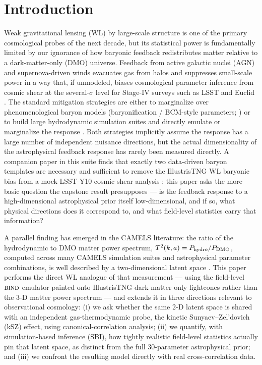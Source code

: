 \documentclass[11pt]{article}
\newcommand{\bind}{\textsc{bind}}
\begin{document}
\section{Introduction}\label{sec:intro}

Weak gravitational lensing (WL) by large-scale structure is one of the
primary cosmological probes of the next decade, but its statistical power
is fundamentally limited by our ignorance of how baryonic feedback
redistributes matter relative to a dark-matter-only (DMO) universe.
Feedback from active galactic nuclei (AGN) and supernova-driven winds
evacuates gas from halos and suppresses small-scale power in a way that,
if unmodeled, biases cosmological parameter inference from cosmic shear
at the several-$\sigma$ level for Stage-IV surveys such as LSST and Euclid
\citep{vanDaalen2020,Schneider2022clusters,Amonetal2023}.
The standard mitigation strategies are either to marginalize over
phenomenological baryon models (baryonification / BCM-style parameters;
\citealp{Arico2024,Schneider2022clusters}) or to build large hydrodynamic
simulation suites and directly emulate or marginalize the response
\citep{VillaescusaNavarro2021CAMELS,Schaye2023FLAMINGO}.
Both strategies implicitly assume the response has a large number of
independent nuisance directions, but the actual dimensionality of the
astrophysical feedback response has rarely been measured directly.
A companion paper in this suite finds that exactly two data-driven baryon
templates are necessary and sufficient to remove the IllustrisTNG WL
baryonic bias from a mock LSST-Y10 cosmic-shear analysis
\citep[Paper~II]{bindII}; this paper asks the more basic question the
capstone result presupposes — is the feedback response to a
high-dimensional astrophysical prior itself low-dimensional, and if so,
what physical directions does it correspond to, and what field-level
statistics carry that information?

A parallel finding has emerged in the CAMELS literature: the ratio of the
hydrodynamic to DMO matter power spectrum, $T^2(k,a) = P_{\rm hydro}/P_{\rm
DMO}$, computed across many CAMELS simulation suites and astrophysical
parameter combinations, is well described by a two-dimensional latent
space \citep{Lin2026latent}. This paper performs the direct WL analogue of
that measurement — using the field-level $\bind$ emulator painted onto
IllustrisTNG dark-matter-only lightcones rather than the 3-D matter power
spectrum — and extends it in three directions relevant to observational
cosmology: (i) we ask whether the same 2-D latent space is shared with an
independent gas-thermodynamic probe, the kinetic Sunyaev--Zel'dovich (kSZ)
effect, using canonical-correlation analysis; (ii) we quantify, with
simulation-based inference (SBI), how tightly realistic field-level
statistics actually pin that latent space, as distinct from the full
30-parameter astrophysical prior; and (iii) we confront the resulting
model directly with real cross-correlation data.
\end{document}
